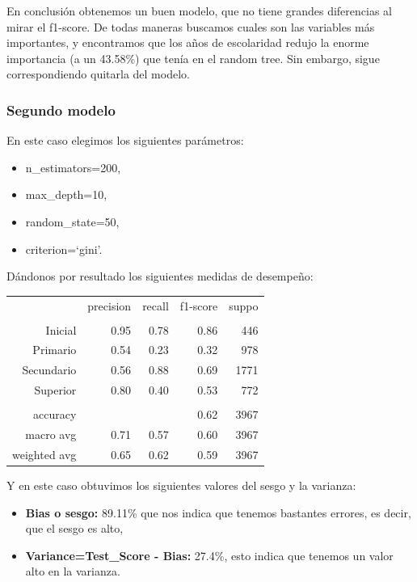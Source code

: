 \documentclass[a4paper]{article}
\begin{document}
             En conclusión obtenemos un buen modelo, que no tiene grandes diferencias al mirar el f1-score. De todas maneras buscamos cuales son las variables más importantes, y encontramos que los años de escolaridad redujo la enorme importancia (a un 43.58\%) que tenía en el random tree. Sin embargo, sigue correspondiendo quitarla del modelo.

        \subsubsection{Segundo modelo}

            En este caso elegimos los siguientes parámetros:
            \begin{itemize}
                \item n\_estimators=200,
                \item max\_depth=10,
                \item random\_state=50,
                \item criterion=`gini'.
            \end{itemize}

            Dándonos por resultado los siguientes medidas de desempeño:
            \begin{table}[H]
                \centering
                \begin{tabular}{rrrrr}
                    ~ & precision & recall & f1-score & suppo \\
                    & & & & \\
                    Inicial    & 0.95 & 0.78 & 0.86 & 446 \\
                    Primario   & 0.54 & 0.23 & 0.32 & 978 \\
                    Secundario & 0.56 & 0.88 & 0.69 & 1771 \\
                    Superior   & 0.80 & 0.40 & 0.53 & 772 \\
                    & & & & \\
                    accuracy & & & 0.62 & 3967 \\
                    macro avg & 0.71 & 0.57 & 0.60 & 3967 \\
                    weighted avg & 0.65 & 0.62 & 0.59 & 3967 \\
                \end{tabular}
            \end{table}

            Y en este caso obtuvimos los siguientes valores del sesgo y la varianza:
            \begin{itemize}
                \item \textbf{Bias o sesgo:} 89.11\% que nos indica que tenemos bastantes errores, es decir, que el sesgo es alto,
                \item \textbf{Variance=Test\_Score - Bias:} 27.4\%, esto indica que tenemos un valor alto en la varianza.
             \end{itemize}
\end{document}
